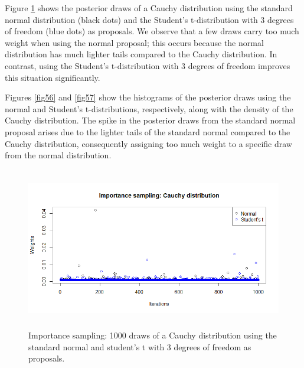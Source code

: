 Figure \ref{fig55} shows the posterior draws of a Cauchy distribution using the standard normal distribution (black dots) and the Student's t-distribution with 3 degrees of freedom (blue dots) as proposals. We observe that a few draws carry too much weight when using the normal proposal; this occurs because the normal distribution has much lighter tails compared to the Cauchy distribution. In contrast, using the Student's t-distribution with 3 degrees of freedom improves this situation significantly.

Figures \ref{fig56} and \ref{fig57} show the histograms of the posterior draws using the normal and Student's t-distributions, respectively, along with the density of the Cauchy distribution. The spike in the posterior draws from the standard normal proposal arises due to the lighter tails of the standard normal compared to the Cauchy distribution, consequently assigning too much weight to a specific draw from the normal distribution.

\begin{figure}[!h]
	\includegraphics[width=340pt, height=200pt]{Chapters/chapter5/figures/ISexampleCauchy.png}
	\caption[List of figure caption goes here]{Importance sampling: 1000 draws of a Cauchy distribution using the standard normal and student's t with 3 degrees of freedom as proposals.}\label{fig55}
\end{figure} 

